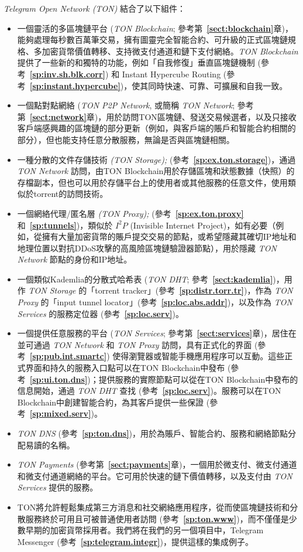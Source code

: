 \documentclass[12pt,oneside]{article}
\def\refpoint#1{{\rm\textbf{\ref{#1}}}}
\let\ptref=\refpoint
\begin{document}
{\em Telegram Open Network (TON)} 結合了以下組件：
\begin{itemize}
\item 一個靈活的多區塊鏈平台 ({\em TON Blockchain}; 參考第~\ptref{sect:blockchain}章)，能夠處理每秒數百萬筆交易，擁有圖靈完全智能合約、可升級的正式區塊鏈規格、多加密貨幣價值轉移、支持微支付通道和鏈下支付網絡。{\em TON Blockchain\/} 提供了一些新的和獨特的功能，例如「自我修復」垂直區塊鏈機制 (參考~\ptref{sp:inv.sh.blk.corr}) 和 Instant Hypercube Routing (參考~\ptref{sp:instant.hypercube})，使其同時快速、可靠、可擴展和自我一致。
\item 一個點對點網絡 ({\em TON P2P Network}, 或簡稱 {\em TON Network}; 參考第~\ptref{sect:network}章)，用於訪問TON區塊鏈、發送交易候選者，以及只接收客戶端感興趣的區塊鏈的部分更新（例如，與客戶端的賬戶和智能合約相關的部分），但也能支持任意分散服務，無論是否與區塊鏈相關。
\item 一種分散的文件存儲技術 {\em (TON Storage);} (參考~\ptref{sp:ex.ton.storage})，通過 {\em TON Network} 訪問，由TON Blockchain用於存儲區塊和狀態數據（快照）的存檔副本，但也可以用於存儲平台上的使用者或其他服務的任意文件，使用類似於torrent的訪問技術。
\item 一個網絡代理/匿名層 {\em (TON Proxy);} (參考~\ptref{sp:ex.ton.proxy} 和~\ptref{sp:tunnels})，類似於 $I^2P$ (Invisible Internet Project)，如有必要（例如，從擁有大量加密貨幣的賬戶提交交易的節點，或希望隱藏其確切IP地址和地理位置以對抗DDoS攻擊的高風險區塊鏈驗證器節點），用於隱藏 {\em TON Network\/} 節點的身份和IP地址。
\item 一個類似Kademlia的分散式哈希表 ({\em TON DHT}; 參考~\ptref{sect:kademlia})，用作 {\em TON Storage} 的「torrent tracker」(參考~\ptref{sp:distr.torr.tr})，作為 {\em TON Proxy\/} 的「input tunnel locator」(參考~\ptref{sp:loc.abs.addr})，以及作為 {\em TON Services} 的服務定位器 (參考~\ptref{sp:loc.serv})。
\item 一個提供任意服務的平台 ({\em TON Services}; 參考第~\ptref{sect:services}章)，居住在並可通過 {\em TON Network\/} 和 {\em TON Proxy} 訪問，具有正式化的界面 (參考~\ptref{sp:pub.int.smartc}) 使得瀏覽器或智能手機應用程序可以互動。這些正式界面和持久的服務入口點可以在TON Blockchain中發布 (參考~\ptref{sp:ui.ton.dns})；提供服務的實際節點可以從在TON Blockchain中發布的信息開始，通過 {\em TON DHT\/} 查找 (參考~\ptref{sp:loc.serv})。服務可以在TON Blockchain中創建智能合約，為其客戶提供一些保證 (參考~\ptref{sp:mixed.serv})。
\item {\em TON DNS\/} (參考~\ptref{sp:ton.dns})，用於為賬戶、智能合約、服務和網絡節點分配易讀的名稱。
\item {\em TON Payments\/} (參考第~\ptref{sect:payments}章)，一個用於微支付、微支付通道和微支付通道網絡的平台。它可用於快速的鏈下價值轉移，以及支付由 {\em TON Services} 提供的服務。
\item TON將允許輕鬆集成第三方消息和社交網絡應用程序，從而使區塊鏈技術和分散服務終於可用且可被普通使用者訪問 (參考~\ptref{sp:ton.www})，而不僅僅是少數早期的加密貨幣採用者。我們將在我們的另一個項目中，Telegram Messenger (參考~\ptref{sp:telegram.integr})，提供這樣的集成例子。
\end{itemize}
\end{document}
